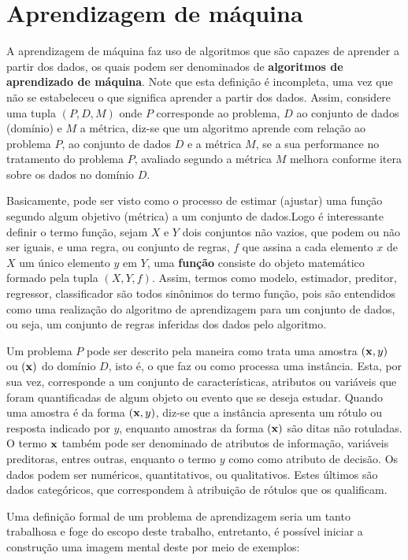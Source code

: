 \section{Aprendizagem de máquina}

A aprendizagem de máquina faz uso de algoritmos que são capazes de aprender a partir dos dados, os quais podem ser denominados de {\bf algoritmos de aprendizado de máquina}. Note que esta definição é incompleta, uma vez que não se estabeleceu o que significa aprender a partir dos dados. Assim, considere uma tupla $(P, D, M)$ onde $P$ corresponde ao problema, $D$ ao conjunto de dados (domínio) e $M$ a métrica, diz-se que um algoritmo aprende com relação ao problema $P$, ao conjunto de dados $D$ e a métrica $M$, se a sua performance no tratamento do problema $P$, avaliado segundo a métrica $M$ melhora conforme itera sobre os dados no domínio $D$.

Basicamente, pode ser visto como o processo de estimar (ajustar) uma função segundo algum objetivo (métrica) a um conjunto de dados.Logo é interessante definir o termo função, sejam $X$ e $Y$ dois conjuntos não vazios, que podem ou não ser iguais, e uma regra, ou conjunto de regras, $f$ que assina a cada elemento $x$ de $X$ um único elemento $y$ em $Y$, uma {\bf função} consiste do objeto matemático formado pela tupla $(X, Y, f)$. Assim, termos como modelo, estimador, preditor, regressor, classificador são todos sinônimos do termo função, pois são entendidos como uma realização do algoritmo de aprendizagem para um conjunto de dados, ou seja, um conjunto de regras inferidas dos dados pelo algoritmo.

Um problema $P$ pode ser descrito pela maneira como trata uma amostra $({\bf x}, y)$ ou $({\bf x})$ do domínio $D$, isto é, o que faz ou como processa uma instância. Esta, por sua vez, corresponde a um conjunto de características, atributos ou variáveis que foram quantificadas de algum objeto ou evento que se deseja estudar. Quando uma amostra é da forma $({\bf x}, y)$, diz-se que a instância apresenta um rótulo ou resposta indicado por $y$, enquanto amostras da forma $({\bf x})$ são ditas não rotuladas. O termo ${\bf x}$ também pode ser denominado de atributos de informação, variáveis preditoras, entres outras, enquanto o termo $y$ como como atributo de decisão. Os dados podem ser numéricos, quantitativos, ou qualitativos. Estes últimos são dados categóricos, que correspondem à atribuição de rótulos que os qualificam.

Uma definição formal de um problema de aprendizagem seria um tanto trabalhosa e foge do escopo deste trabalho, entretanto, é possível iniciar a construção uma imagem mental deste por meio de exemplos:

